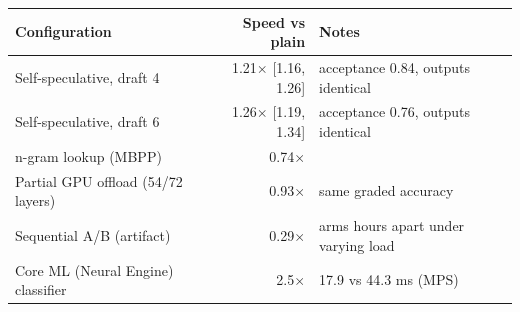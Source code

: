 \begin{tabular}{lrl}
\toprule
Configuration & Speed vs plain & Notes \\
\midrule
Self-speculative, draft 4 & 1.21$\times$ [1.16, 1.26] & acceptance 0.84, outputs identical \\
Self-speculative, draft 6 & 1.26$\times$ [1.19, 1.34] & acceptance 0.76, outputs identical \\
n-gram lookup (MBPP) & 0.74$\times$ & \\
Partial GPU offload (54/72 layers) & 0.93$\times$ & same graded accuracy \\
Sequential A/B (artifact) & 0.29$\times$ & arms hours apart under varying load \\
Core ML (Neural Engine) classifier & 2.5$\times$ & 17.9 vs 44.3 ms (MPS) \\
\bottomrule
\end{tabular}
